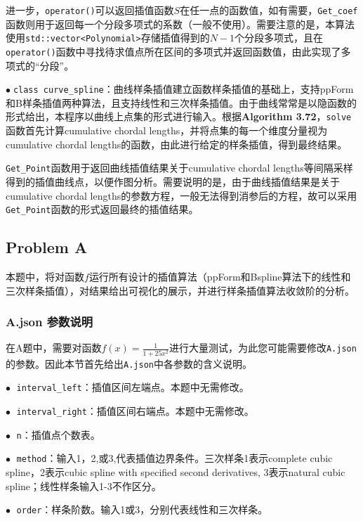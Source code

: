 \documentclass{ctexart}
\begin{document}
\begin{sloppypar}
进一步，\verb|operator()|可以返回插值函数$S$在任一点的函数值，如有需要，\verb|Get_coef|函数则用于返回每一个分段多项式的系数（一般不使用）。需要注意的是，本算法使用\verb|std::vector<Polynomial>|存储插值得到的$N-1$个分段多项式，且在\verb|operator()|函数中寻找待求值点所在区间的多项式并返回函数值，由此实现了多项式的“分段”。

$\bullet \;$\verb|class curve_spline|：曲线样条插值建立函数样条插值的基础上，支持ppForm和B样条插值两种算法，且支持线性和三次样条插值。由于曲线常常是以隐函数的形式给出，本程序以曲线上点集的形式进行输入。根据\textbf{Algorithm 3.72}，\verb|solve|函数首先计算cumulative chordal lengths，并将点集的每一个维度分量视为cumulative chordal lengths的函数，由此进行给定的样条插值，得到最终结果。

\verb|Get_Point|函数用于返回曲线插值结果关于cumulative chordal lengths等间隔采样得到的插值曲线点，以便作图分析。需要说明的是，由于曲线插值结果是关于cumulative chordal lengths的参数方程，一般无法得到消参后的方程，故可以采用\verb|Get_Point|函数的形式返回最终的插值结果。

\subsection{Problem A}
本题中，将对函数$f$运行所有设计的插值算法（ppForm和Bspline算法下的线性和三次样条插值），对结果给出可视化的展示，并进行样条插值算法收敛阶的分析。

\subsubsection{A.json 参数说明}
在A题中，需要对函数$f(x)=\frac{1}{1+25x^2}$进行大量测试，为此您可能需要修改\verb|A.json|的参数。因此本节首先给出\verb|A.json|中各参数的含义说明。

$\bullet \;$ \verb|interval_left|：插值区间左端点。本题中无需修改。

$\bullet \;$ \verb|interval_right|：插值区间右端点。本题中无需修改。

$\bullet \;$ \verb|n|：插值点个数表。

$\bullet \;$ \verb|method|：输入1，2,或3,代表插值边界条件。三次样条1表示complete cubic spline，2表示cubic spline with specified second derivatives, 3表示natural cubic spline；线性样条输入1-3不作区分。

$\bullet \;$ \verb|order|：样条阶数。输入1或3，分别代表线性和三次样条。


\end{sloppypar}
\end{document}
